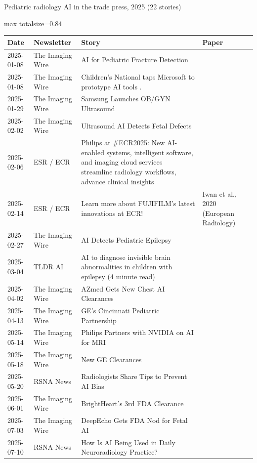 \documentclass[aspectratio=169]{beamer}
\renewcommand{\arraystretch}{1.08}
\begin{document}
\begin{frame}[category=Newsletters]{Pediatric radiology AI in the trade press, 2025 (22 stories)}
\tiny
\begin{adjustbox}{max totalsize={\textwidth}{0.84\textheight}}
\renewcommand{\arraystretch}{1.2}
\begin{tabular}{|l|l|>{\raggedright\arraybackslash}p{}|>{\raggedright\arraybackslash}p{}|}
\hline \textbf{Date} & \textbf{Newsletter} & \textbf{Story} & \textbf{Paper} \\ \hline
2025-01-08 & The Imaging Wire & AI for Pediatric Fracture Detection &  \\ \hline
2025-01-08 & The Imaging Wire & Children's National taps Microsoft to prototype AI tools . &  \\ \hline
2025-01-29 & The Imaging Wire & Samsung Launches OB/GYN Ultrasound &  \\ \hline
2025-02-02 & The Imaging Wire & Ultrasound AI Detects Fetal Defects &  \\ \hline
2025-02-06 & ESR / ECR & Philips at \#ECR2025: New AI-enabled systems, intelligent software, and imaging cloud services streamline radiology workflows, advance clinical insights &  \\ \hline
2025-02-14 & ESR / ECR & Learn more about FUJIFILM's latest innovations at ECR! & Iwan et al., 2020 (European Radiology) \\ \hline
2025-02-27 & The Imaging Wire & AI Detects Pediatric Epilepsy &  \\ \hline
2025-03-04 & TLDR AI & AI to diagnose invisible brain abnormalities in children with epilepsy (4 minute read) &  \\ \hline
2025-04-02 & The Imaging Wire & AZmed Gets New Chest AI Clearances &  \\ \hline
2025-04-13 & The Imaging Wire & GE's Cincinnati Pediatric Partnership &  \\ \hline
2025-05-14 & The Imaging Wire & Philips Partners with NVIDIA on AI for MRI &  \\ \hline
2025-05-18 & The Imaging Wire & New GE Clearances &  \\ \hline
2025-05-20 & RSNA News & Radiologists Share Tips to Prevent AI Bias &  \\ \hline
2025-06-01 & The Imaging Wire & BrightHeart's 3rd FDA Clearance &  \\ \hline
2025-07-03 & The Imaging Wire & DeepEcho Gets FDA Nod for Fetal AI &  \\ \hline
2025-07-10 & RSNA News & How Is AI Being Used in Daily Neuroradiology Practice? &  \\ \hline

\end{tabular}
\end{adjustbox}
\end{frame}
\end{document}
